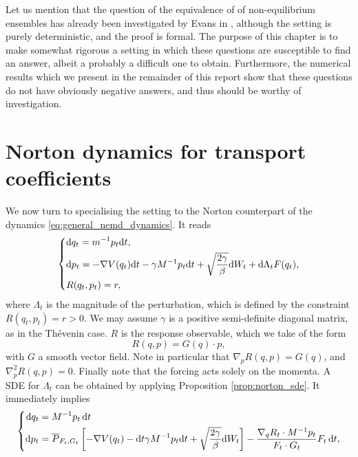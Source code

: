 Let us mention that the question of the equivalence of of non-equilibrium ensembles has already been investigated by Evans in \cite{E93}, although the setting is purely deterministic, and the proof is formal.
The purpose of this chapter is to make somewhat rigorous a setting in which these questions are susceptible to find an answer, albeit a probably a difficult one to obtain.
Furthermore, the numerical results which we present in the remainder of this report show that these questions do not have obviously negative answers, and thus should be worthy of investigation.

\section{Norton dynamics for transport coefficients}
We now turn to specialising the setting to the Norton counterpart of the dynamics \eqref{eq:general_nemd_dynamics}. It reads
\begin{equation}
    \label{eq:norton_dynamics_general}
    \left\{ 
        \begin{aligned}
            &\mathrm{d} q_t=m^{-1}p_t\mathrm{d} t,\\
            &\mathrm{d} p_t=-\nabla V(q_t)\mathrm{d} t-\gamma M^{-1}p_t\mathrm{d} t +\sqrt{\frac{2\gamma}\beta}\mathrm{d} W_t +\mathrm{d} \Lambda_t F(q_t),\\
            &R(q_t,p_t)=r,
        \end{aligned}
    \right.
\end{equation}
where $\Lambda_t$ is the magnitude of the perturbation, which is defined by the constraint $R(q_t,p_t)=r>0$.
We may assume $\gamma$ is a positive semi-definite diagonal matrix, as in the Thévenin case. $R$ is the response observable, which we take of the form
\[R(q,p)=G(q)\cdot p,\]
with $G$ a smooth vector field. Note in particular that $\nabla_p R(q,p)=G(q)$, and $\nabla_p^2 R(q,p)=0$. Finally note that the forcing acts solely on the momenta.
A SDE for $\Lambda_t$ can be obtained by applying Proposition \ref{prop:norton_sde}.
It immediately implies 
\begin{equation}
    \label{eq:norton_dynamics_general_solved}
    \left\{
        \begin{aligned}
            \mathrm{d} q_t &= M^{-1}p_t \,\mathrm{d} t\\
            \mathrm{d} p_t &= \overline{P}_{F_t,G_t}\left[-\nabla V(q_t)-\mathrm{d} t\gamma M^{-1}p_t\mathrm{d} t + \sqrt{\frac{2\gamma}{\beta}}\mathrm{d} W_t\right] - \frac{\nabla_q R_t\cdot M^{-1}p_t}{F_t\cdot G_t}F_t\,\mathrm{d} t,
        \end{aligned}\right.
\end{equation}
